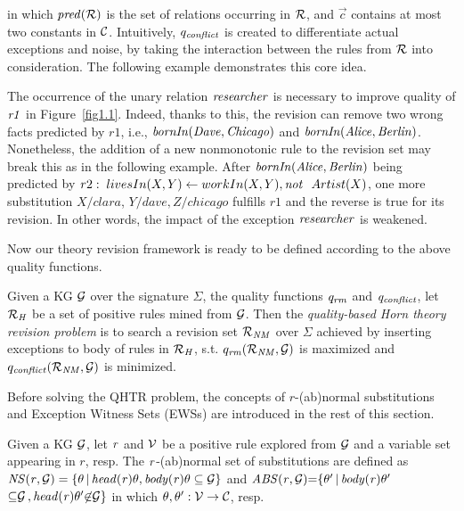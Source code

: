 in which $\mathit{pred(\mathcal{R})}$ is the set of relations occurring in $\mathcal{R}$, and $\vec{c}$ contains at most two constants in $\mathcal{C}$. Intuitively, $q_{\mathit{conflict}}$ is created to differentiate actual exceptions and noise, by taking the interaction between the rules from $\mathcal{R}$ into consideration. The following example demonstrates this core idea.

\begin{example} 
The occurrence of the unary relation $\mathit{researcher}$ is necessary to improve quality of $\mathit{r1}$ in Figure~\ref{fig1.1}. Indeed, thanks to this, the revision can remove two wrong facts predicted by $r1$, i.e., $\mathit{bornIn(Dave,Chicago)}$ and $\mathit{bornIn(Alice,Berlin)}$. Nonetheless, the addition of a new nonmonotonic rule to the revision set may break this as in the following example. After $\mathit{bornIn(Alice,Berlin)}$ being predicted by $r2:\; livesIn(X,Y)\leftarrow workIn(X,Y),\mathit{not}~ \ Artist(X)$, one more substitution $X/clara$, $Y/dave,Z/chicago$ fulfills $r1$ and the reverse is true for its revision. In other words, the impact of the exception $\mathit{researcher}$ is weakened.
\end{example}

Now our theory revision framework is ready to be defined according to the above quality functions.

\begin{definition} \label{def:qhtr}
Given a KG $\mathcal{G}$ over the signature $\Sigma$, the quality functions $\mathit{q_{rm}}$ and $\mathit{q_{conflict}}$, let $\mathcal{R}_{\mathit{H}}$ be a set of positive rules mined from $\mathcal{G}$. Then the \emph{quality-based Horn theory revision problem} is to search a revision set $\mathcal{R}_{\mathit{NM}}$ over $\Sigma$ achieved by inserting exceptions to body of rules in $\mathcal{R}_{\mathit{H}}$, s.t. $q_{\mathit{rm}}(\mathcal{R}_{\mathit{NM}},\mathcal{G})$ is maximized and $q_{\mathit{conflict}}(\mathcal{R}_{\mathit{NM}},\mathcal{G})$ is minimized.
\end{definition}

Before solving the QHTR problem, the concepts of $r$-(ab)normal substitutions and Exception Witness Sets (EWSs) are introduced in the rest of this section.

\begin{definition}\label{sec:rulelearn}
Given a KG $\mathcal{G}$, let $\mathit{r}$ and $\mathcal{V}$ be a positive rule explored from $\mathcal{G}$ and a variable set appearing in $r$, resp. The $\mathit{r}$-(ab)normal set of substitutions are defined as $\mathit{NS(r, \mathcal{G})=\{\theta\, |\, head(r)\theta,body(r)\theta \subseteq \mathcal{G}\}}$ and $\mathit{ABS(r, \mathcal{G}){=}\{\theta'\, |\, body(r)\theta'}$\\ $\mathit{{\subseteq} \mathcal{G}\,{,}\,head(r)\theta' {\not \in} \mathcal{G}\}}$ in which $\theta,\theta':\mathcal{V} \rightarrow \mathcal{C}$, resp.
\end{definition}

